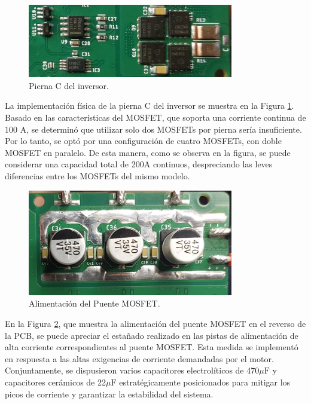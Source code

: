 \documentclass[11pt]{report}
\begin{document}
\begin{figure}[ht]
	\centering
	\includegraphics[width=0.8\textwidth]{imagenes/PCB/FULL_Pierna_C.jpg}
	\caption{Pierna C del inversor.}
	\label{PCB_pierna_C}
\end{figure}
\FloatBarrier

La implementación física de la pierna C del inversor se muestra en la Figura \ref{PCB_pierna_C}.  Basado en las características del MOSFET, que soporta una corriente continua de 100 A, se determinó que utilizar solo dos MOSFETs por pierna sería insuficiente. Por lo tanto, se optó por una configuración de cuatro MOSFETs, con doble MOSFET en paralelo. De esta manera, como se observa en la figura,  se puede considerar una capacidad total de 200A continuos, despreciando las leves diferencias entre los MOSFETs del mismo modelo.

\begin{figure}[ht]
	\centering
	\includegraphics[width=0.8\textwidth]{imagenes/PCB/alimentacion mosfet.jpg}
	\caption{Alimentación del Puente MOSFET.}
	\label{alimentacion}
\end{figure}
\FloatBarrier

En la Figura \ref{alimentacion}, que muestra la alimentación del puente MOSFET en el reverso de la PCB, se puede apreciar el estañado realizado en las pistas de alimentación de alta corriente correspondientes al puente MOSFET. Esta medida se implementó en respuesta a las altas exigencias de corriente demandadas por el motor.  Conjuntamente, se dispusieron varios capacitores electrolíticos de 470$\mu\text{F}$ y capacitores cerámicos de 22$\mu\text{F}$ estratégicamente posicionados para mitigar los picos de corriente y garantizar la estabilidad del sistema.
\end{document}
